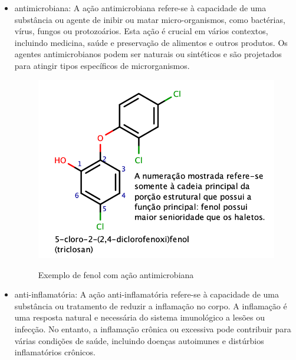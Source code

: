 \begin{itemize}
\begin{figure}[H]
    \label{fig:doxo}
    \end{figure}
    \item antimicrobiana: A ação antimicrobiana refere-se à capacidade de uma substância ou agente de inibir ou matar micro-organismos, como bactérias, vírus, fungos ou protozoários. Esta ação é crucial em vários contextos, incluindo medicina, saúde e preservação de alimentos e outros produtos. Os agentes antimicrobianos podem ser naturais ou sintéticos e são projetados para atingir tipos específicos de microrganismos.
    \begin{figure}[H]
        \centering
        \caption{Exemplo de fenol com ação antimicrobiana}
        \vspace{0.5cm}
        \includegraphics[width=0.65\linewidth]{imagens/triclosan.png}
    \label{fig:triclosan}
    \end{figure}
    \item anti-inflamatória: A ação anti-inflamatória refere-se à capacidade de uma substância ou tratamento de reduzir a inflamação no corpo. A inflamação é uma resposta natural e necessária do sistema imunológico a lesões ou infecção. No entanto, a inflamação crônica ou excessiva pode contribuir para várias condições de saúde, incluindo doenças autoimunes e distúrbios inflamatórios crônicos.


\end{itemize}
